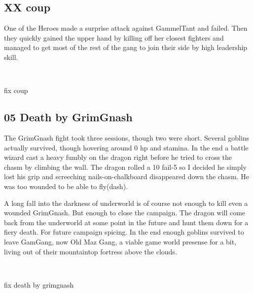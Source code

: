 \subsection*{XX coup}

One of the Heroes made a surprise attack against GammelTant and failed. Then they quickly gained the upper hand by killing off her closest fighters and managed to get most of the rest of the gang to join their side by high leadership skill.

\

\TODO fix coup






\subsection*{05 Death by GrimGnash}

The GrimGnash fight took three sessions, though two were short. Several goblins actually survived, though hovering around 0 hp and stamina. In the end a battle wizard cast a heavy fumbly on the dragon right before he tried to cross the chasm by climbing the wall. The dragon rolled a 10 fail-5 so I decided he simply lost his grip and screeching nails-on-chalkboard disappeared down the chasm. He was too wounded to be able to fly(dash).

A long fall into the darkness of underworld is of course not enough to kill even a wounded GrimGnash. But enough to close the campaign. The dragon will come back from the underworld at some point in the future and hunt them down for a fiery death. For future campaign spicing. In the end enough goblins survived to leave GamGang, now Old Maz Gang, a viable game world presense for a bit, living out of their mountaintop fortress above the clouds.

\

\TODO fix death by grimgnash


























\clearpage
